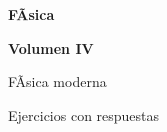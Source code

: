 ﻿\documentclass[11pt,letterpaper,openany]{book}
\newcommand{\numerovolumen}{IV}
\newcommand{\nombrevolumen}{FÃ­sica moderna}
\begin{document}

\begin{titlepage}

    \centering

    \vspace*{2.5cm}

    {\color{RojoPrincipal}
    \Huge\bfseries
    FÃ­sica
    \par}

    \vspace{0.8cm}

    {\color{AzulPrincipal}
    \LARGE\bfseries
    Volumen \numerovolumen
    \par}

    \vspace{0.5cm}

    {\Large
    \nombrevolumen
    \par}

    \vspace{1.5cm}

    {\color{AzulPrincipal}
    \Large
    Ejercicios con respuestas
    \par}

    \vfill

    {\Large\bfseries
    \autorlibro
    \par}

    \vspace{2cm}

\end{titlepage}



\frontmatter

\tableofcontents

\cleardoublepage



\mainmatter
\end{document}
